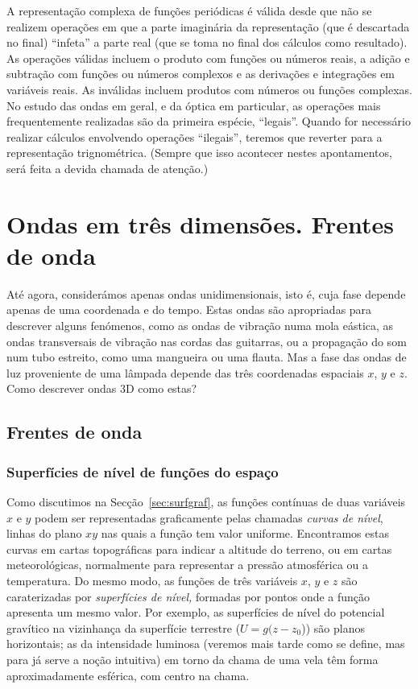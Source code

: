 A representação complexa de funções periódicas é válida desde que não se
realizem operações em que a parte imaginária da representação (que é descartada
no final) ``infeta'' a parte real (que se toma no final dos cálculos como
resultado). As operações válidas incluem o produto com funções ou números reais, a adição e
subtração com funções ou números complexos e as derivações e integrações em
variáveis reais. As inválidas incluem produtos com números ou funções complexas.
No estudo das ondas em geral, e da óptica em particular, as operações mais
frequentemente realizadas são da primeira espécie, ``legais''. Quando for
necessário realizar cálculos envolvendo operações ``ilegais'', teremos que
reverter para a representação trignométrica. (Sempre que isso acontecer nestes
apontamentos, será feita a devida chamada de atenção.)

\section{Ondas em três dimensões. Frentes de onda}
Até agora, considerámos apenas ondas unidimensionais, isto é, cuja fase depende
apenas de uma coordenada e do tempo. Estas ondas são apropriadas para descrever
alguns fenómenos, como as ondas de vibração numa mola eástica, as ondas
transversais de vibração nas cordas das guitarras, ou a propagação do som num
tubo estreito, como uma mangueira ou uma flauta. Mas a fase das ondas de luz
proveniente de uma lâmpada depende das três coordenadas espaciais $x$, $y$ e
$z$. Como descrever ondas 3D como estas?



\subsection{Frentes de onda}
\subsubsection*{Superfícies de nível de funções do espaço}
Como discutimos na Secção~\ref{sec:surfgraf}, as funções contínuas de duas
variáveis $x$ e $y$ podem ser representadas graficamente pelas chamadas
\emph{curvas de nível}, linhas do plano $xy$ nas quais a função tem valor
uniforme. Encontramos estas curvas em cartas topográficas para indicar a
altitude do terreno, ou em cartas meteorológicas, normalmente para representar a
pressão atmosférica ou a temperatura. Do mesmo modo, as funções de três
variáveis $x$, $y$ e $z$ são caraterizadas por \emph{superfícies de nível,}
formadas por pontos onde a função apresenta um mesmo valor. Por exemplo, as
superfícies de nível do potencial gravítico na vizinhança da superfície
terrestre ($U=g(z-z_0$)) são planos horizontais; as da intensidade luminosa
(veremos mais tarde como se define, mas para já serve a noção intuitiva) em
torno da chama de uma vela têm forma aproximadamente esférica, com centro na
chama.

